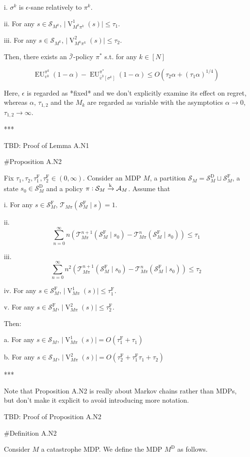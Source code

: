\documentclass[a4paper]{article}
\newcommand{\AP}[1]{\left(#1\right)}
\newcommand{\AB}[1]{\left[#1\right]}
\newcommand{\Abs}[1]{\lvert #1 \rvert}
\newcommand{\M}{\xrightarrow{\textnormal{k}}}
\newcommand{\A}{\mathcal{A}}
\newcommand{\St}{\mathcal{S}}
\newcommand{\T}{\mathcal{T}}
\newcommand{\In}{\mathcal{I}}
\newcommand{\Adi}{{\bar{\In}}}
\newcommand{\RMD}{\mathrm{D}}
\newcommand{\RMF}{\mathrm{F}}
\newcommand{\SF}{\St^{\RMF}}
\newcommand{\SD}{\St^{\RMD}}
\newcommand{\MD}{M^{\RMD}}
\newcommand{\TF}{\tau^{\RMF}}
\newcommand{\V}{\operatorname{V}}
\newcommand{\EU}{\operatorname{EU}}
\begin{document}
i. $\sigma^k$ is $\epsilon$-sane relatively to $\pi^k$.

ii. For any $s \in \St_{M^k}$, $\Abs{\V^1_{M^k\pi^k}(s)} \leq \tau_1$.

iii. For any $s \in \St_{M^k}$, $\Abs{\V^2_{M^k\pi^k}(s)} \leq \tau_2$.

Then, there exists an $\Adi$-policy $\pi^*$ s.t. for any $k \in [N]$

$$\EU_{\upsilon^k}^{\pi^k}(1-\alpha) - \EU_{\bar{\upsilon}^k\AB{\sigma^k}}^{\pi^*}(1-\alpha) \leq O\AP{\tau_2 \alpha + (\tau_1 \alpha)^{1/4}}$$

Here, $\epsilon$ is regarded as *fixed* and we don't explicitly examine its effect on regret, whereas $\alpha$, $\tau_{1,2}$ and the $M_k$ are regarded as variable with the asymptotics $\alpha \rightarrow 0$, $\tau_{1,2} \rightarrow \infty$.

***

TBD: Proof of Lemma A.N1 %

\#Proposition A.N2

Fix $\tau_1, \tau_2, \TF_1, \TF_2 \in (0,\infty)$. Consider an MDP $M$, a partition $\St_M = \SD_M \sqcup \SF_M$, a state $s_0 \in \SD_M$ and a policy $\pi: \St_M \M \A_M$. Assume that

i. For any $s \in \SF_M$, $\T_{M\pi}\AP{\SF_M \mid s}=1$.

ii. $$\sum_{n=0}^\infty n \AP{\T_{M\pi}^{n+1}\AP{\SF_M \mid s_0}-\T_{M\pi}^{n}\AP{\SF_M \mid s_0}} \leq \tau_1$$

iii. $$\sum_{n=0}^\infty n^2 \AP{\T_{M\pi}^{n+1}\AP{\SF_M \mid s_0}-\T_{M\pi}^{n}\AP{\SF_M \mid s_0}} \leq \tau_2$$

iv. For any $s \in \SF_M$, $\Abs{\V^1_{M\pi}(s)} \leq \TF_1$.

v. For any $s \in \SF_M$, $\Abs{\V^2_{M\pi}(s)} \leq \TF_2$. 

Then:

a. For any $s \in \St_M$, $\Abs{\V^1_{M\pi}(s)} = O\AP{\TF_1 + \tau_1}$

b. For any $s \in \St_M$, $\Abs{\V^2_{M\pi}(s)} = O\AP{\TF_2 + \TF_1 \tau_1 + \tau_2}$

***

Note that Proposition A.N2 is really about Markov chains rather than MDPs, but don't make it explicit to avoid introducing more notation.

TBD: Proof of Proposition A.N2

\#Definition A.N2

Consider $M$ a catastrophe MDP. We define the MDP $\MD$ as follows.
\end{document}
